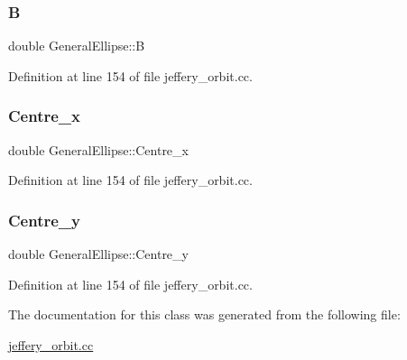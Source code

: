 \subsubsection{\texorpdfstring{B}{B}}
{\footnotesize\ttfamily double General\+Ellipse\+::B\hspace{0.3cm}{\ttfamily [private]}}



Definition at line 154 of file jeffery\+\_\+orbit.\+cc.

\mbox{\label{classGeneralEllipse_aeb974769f58d136a12ac1532506304cc}} 
\subsubsection{\texorpdfstring{Centre\+\_\+x}{Centre\_x}}
{\footnotesize\ttfamily double General\+Ellipse\+::\+Centre\+\_\+x\hspace{0.3cm}{\ttfamily [private]}}



Definition at line 154 of file jeffery\+\_\+orbit.\+cc.

\mbox{\label{classGeneralEllipse_abf2def5a5140bb35e381b800c4b91dc9}} 
\subsubsection{\texorpdfstring{Centre\+\_\+y}{Centre\_y}}
{\footnotesize\ttfamily double General\+Ellipse\+::\+Centre\+\_\+y\hspace{0.3cm}{\ttfamily [private]}}



Definition at line 154 of file jeffery\+\_\+orbit.\+cc.



The documentation for this class was generated from the following file\+:\begin{DoxyCompactItemize}
\item 
\hyperlink{jeffery__orbit_8cc}{jeffery\+\_\+orbit.\+cc}\end{DoxyCompactItemize}
